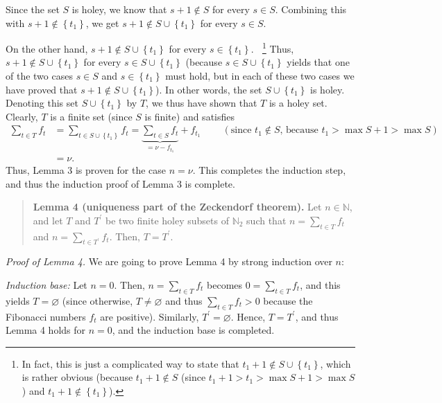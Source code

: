 \documentclass[12pt,final,notitlepage,onecolumn]{article}%
\begin{document}
Since the set $S$ is holey, we know that $s+1\notin S$ for every $s\in S$.
Combining this with $s+1\notin\left\{  t_{1}\right\}  $, we get $s+1\notin
S\cup\left\{  t_{1}\right\}  $ for every $s\in S$.

On the other hand, $s+1\notin S\cup\left\{  t_{1}\right\}  $ for every
$s\in\left\{  t_{1}\right\}  $.$\ \ \ \ $\footnote{In fact, this is just a
complicated way to state that $t_{1}+1\notin S\cup\left\{  t_{1}\right\}  $,
which is rather obvious (because $t_{1}+1\notin S$ (since $t_{1}+1>t_{1}>\max
S+1>\max S$) and $t_{1}+1\notin\left\{  t_{1}\right\}  $).} Thus, $s+1\notin
S\cup\left\{  t_{1}\right\}  $ for every $s\in S\cup\left\{  t_{1}\right\}  $
(because $s\in S\cup\left\{  t_{1}\right\}  $ yields that one of the two cases
$s\in S$ and $s\in\left\{  t_{1}\right\}  $ must hold, but in each of these
two cases we have proved that $s+1\notin S\cup\left\{  t_{1}\right\}  $). In
other words, the set $S\cup\left\{  t_{1}\right\}  $ is holey. Denoting this
set $S\cup\left\{  t_{1}\right\}  $ by $T$, we thus have shown that $T$ is a
holey set. Clearly, $T$ is a finite set (since $S$ is finite) and satisfies%
\begin{align*}
\sum\limits_{t\in T}f_{t}  &  =\sum\limits_{t\in S\cup\left\{  t_{1}\right\}
}f_{t}=\underbrace{\sum\limits_{t\in S}f_{t}}_{=\nu-f_{t_{1}}}+f_{t_{1}%
}\ \ \ \ \ \ \ \ \ \ \left(  \text{since }t_{1}\notin S\text{, because }%
t_{1}>\max S+1>\max S\right) \\
&  =\nu.
\end{align*}
Thus, Lemma 3 is proven for the case $n=\nu$. This completes the induction
step, and thus the induction proof of Lemma 3 is complete.

\begin{quote}
\textbf{Lemma 4 (uniqueness part of the Zeckendorf theorem).} Let
$n\in\mathbb{N}$, and let $T$ and $T^{\prime}$ be two finite holey subsets of
$\mathbb{N}_{2}$ such that $n=\sum\limits_{t\in T}f_{t}$ and $n=\sum
\limits_{t\in T^{\prime}}f_{t}$. Then, $T=T^{\prime}$.
\end{quote}

\textit{Proof of Lemma 4.} We are going to prove Lemma 4 by strong induction
over $n$:

\textit{Induction base:} Let $n=0$. Then, $n=\sum\limits_{t\in T}f_{t}$
becomes $0=\sum\limits_{t\in T}f_{t}$, and this yields $T=\varnothing$ (since
otherwise, $T\neq\varnothing$ and thus $\sum\limits_{t\in T}f_{t}>0$ because
the Fibonacci numbers $f_{t}$ are positive). Similarly, $T^{\prime
}=\varnothing$. Hence, $T=T^{\prime}$, and thus Lemma 4 holds for $n=0$, and
the induction base is completed.
\end{document}
